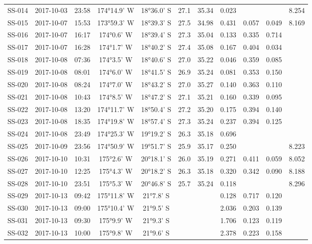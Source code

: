 \begin{longtable}{ccccccccccc}
  SS-014 & 2017-10-03 & 23:58 & 174°14.9' W & 18°36.0' S & 27.1 & 35.34 & 0.023 &  &  & 8.254 \\ 
  SS-015 & 2017-10-07 & 15:53 & 173°59.3' W & 18°39.3' S & 27.5 & 34.98 & 0.431 & 0.057 & 0.049 & 8.169 \\ 
  SS-016 & 2017-10-07 & 16:17 & 174°0.6' W & 18°39.4' S & 27.3 & 35.04 & 0.133 & 0.335 & 0.714 &  \\ 
  SS-017 & 2017-10-07 & 16:28 & 174°1.7' W & 18°40.2' S & 27.4 & 35.08 & 0.167 & 0.404 & 0.034 &  \\ 
  SS-018 & 2017-10-08 & 07:36 & 174°3.5' W & 18°40.6' S & 27.0 & 35.22 & 0.046 & 0.359 & 0.085 &  \\ 
  SS-019 & 2017-10-08 & 08:01 & 174°6.0' W & 18°41.5' S & 26.9 & 35.24 & 0.081 & 0.353 & 0.150 &  \\ 
  SS-020 & 2017-10-08 & 08:24 & 174°7.0' W & 18°43.2' S & 27.0 & 35.27 & 0.140 & 0.363 & 0.110 &  \\ 
  SS-021 & 2017-10-08 & 10:43 & 174°8.5' W & 18°47.2' S & 27.1 & 35.21 & 0.160 & 0.339 & 0.095 &  \\ 
  SS-022 & 2017-10-08 & 13:20 & 174°11.7' W & 18°50.4' S & 27.2 & 35.20 & 0.175 & 0.394 & 0.140 &  \\ 
  SS-023 & 2017-10-08 & 18:35 & 174°19.8' W & 18°57.4' S & 27.3 & 35.24 & 0.237 & 0.394 & 0.125 &  \\ 
  SS-024 & 2017-10-08 & 23:49 & 174°25.3' W & 19°19.2' S & 26.3 & 35.18 & 0.696 &  &  &  \\ 
  SS-025 & 2017-10-09 & 23:56 & 174°50.9' W & 19°51.7' S & 25.9 & 35.17 & 0.250 &  &  & 8.223 \\ 
  SS-026 & 2017-10-10 & 10:31 & 175°2.6' W & 20°18.1' S & 26.0 & 35.19 & 0.271 & 0.411 & 0.059 & 8.052 \\ 
  SS-027 & 2017-10-10 & 12:25 & 175°4.3' W & 20°18.2' S & 26.3 & 35.18 & 0.320 & 0.342 & 0.090 & 8.188 \\ 
  SS-028 & 2017-10-10 & 23:51 & 175°5.3' W & 20°46.8' S & 25.7 & 35.24 & 0.118 &  &  & 8.296 \\ 
  SS-029 & 2017-10-13 & 09:42 & 175°11.8' W & 21°7.8' S &  &  & 0.128 & 0.717 & 0.120 &  \\ 
  SS-030 & 2017-10-13 & 09:00 & 175°10.4' W & 21°9.5' S &  &  & 2.036 & 0.203 & 0.139 &  \\ 
  SS-031 & 2017-10-13 & 09:30 & 175°9.9' W & 21°9.3' S &  &  & 1.706 & 0.123 & 0.119 &  \\ 
  SS-032 & 2017-10-13 & 10:00 & 175°9.8' W & 21°9.6' S &  &  & 2.378 & 0.223 & 0.158 &  \\ 

\end{longtable}
